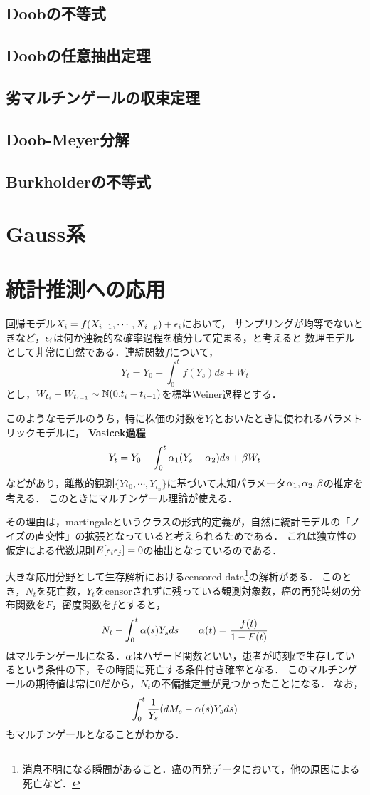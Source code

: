 \documentclass[uplatex,dvipdfmx]{jsreport}
\begin{document}
\subsection{Doobの不等式}

\subsection{Doobの任意抽出定理}

\subsection{劣マルチンゲールの収束定理}

\subsection{Doob-Meyer分解}

\subsection{Burkholderの不等式}

\section{Gauss系}

\section{統計推測への応用}

回帰モデル$X_i=f(X_{i-1},\cdots,X_{i-p})+\epsilon_i$において，
サンプリングが均等でないときなど，$\epsilon_i$は何か連続的な確率過程を積分して定まる，と考えると
数理モデルとして非常に自然である．連続関数$f$について，
\[Y_t=Y_0+\int^t_0f(Y_s)ds+W_t\]
とし，$W_{t_i}-W_{t_{i-1}}\sim\mathbb{N}(0.t_i-t_{i-1})$を標準Weiner過程とする．

このようなモデルのうち，特に株価の対数を$Y_t$とおいたときに使われるパラメトリックモデルに，
\textbf{Vasicek過程}
\[Y_t=Y_0-\int^t_0\alpha_1(Y_s-\alpha_2)ds+\beta W_t\]
などがあり，離散的観測$\{Y{t_0},\cdots,Y_{t_n}\}$に基づいて未知パラメータ$\alpha_1,\alpha_2,\beta$の推定を考える．
このときにマルチンゲール理論が使える．

その理由は，martingaleというクラスの形式的定義が，自然に統計モデルの「ノイズの直交性」の拡張となっていると考えられるためである．
これは独立性の仮定による代数規則$E[\epsilon_i\epsilon_j]=0$の抽出となっているのである．

大きな応用分野として生存解析におけるcensored data\footnote{消息不明になる瞬間があること．癌の再発データにおいて，他の原因による死亡など．}の解析がある．
このとき，$N_t$を死亡数，$Y_t$をcensorされずに残っている観測対象数，癌の再発時刻の分布関数を$F$，密度関数を$f$とすると，
\[N_t-\int^t_0\alpha(s)Y_sds\qquad\alpha(t)=\frac{f(t)}{1-F(t)}\]
はマルチンゲールになる．$\alpha$はハザード関数といい，患者が時刻$t$で生存しているという条件の下，その時間に死亡する条件付き確率となる．
このマルチンゲールの期待値は常に$0$だから，$N_t$の不偏推定量が見つかったことになる．
なお，
\[\int^t_0\frac{1}{Y_s}(dM_s-\alpha(s)Y_sds)\]
もマルチンゲールとなることがわかる．
\end{document}
